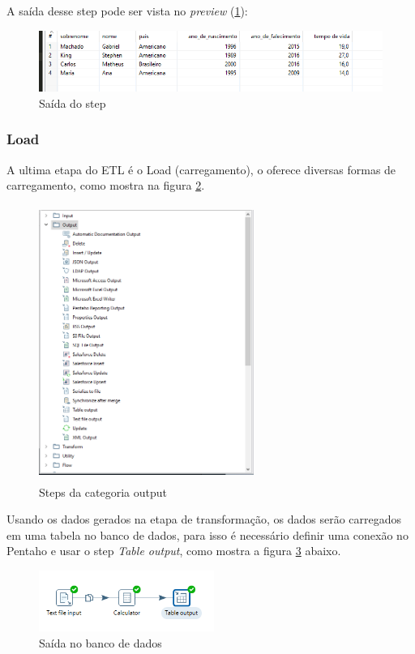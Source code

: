 A saída desse step pode ser vista no \textit{preview} (\ref{preview}):
\begin{figure}[H]
\centering
\includegraphics[height=2cm]{imagens/saidavida.png}
\caption{Saída do step}
\label{preview}
\end{figure}
\subsubsection{Load}
A ultima etapa do ETL é o Load (carregamento), o \pdi oferece diversas formas de carregamento, como mostra na figura \ref{outputsteps}.
\begin{figure}[H]
\centering
\includegraphics[width=7cm, height=9cm]{imagens/output.png}
\caption{Steps da categoria output}
\label{outputsteps}
\end{figure}
Usando os dados gerados na etapa de transformação, os dados serão carregados em uma tabela no banco de dados, para isso é necessário definir uma conexão no Pentaho e usar o step \textit{Table output}, como mostra a figura \ref{outputstep} abaixo.
\begin{figure}[H]
\centering
\includegraphics[height=2cm]{imagens/tableoutput.png}
\caption{Saída no banco de dados}
\label{outputstep}
\end{figure}
